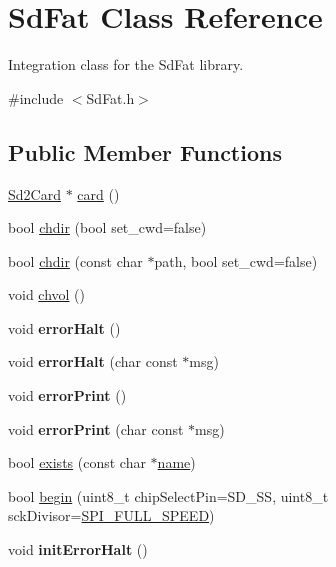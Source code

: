 \hypertarget{class_sd_fat}{}\section{Sd\+Fat Class Reference}
\label{class_sd_fat}


Integration class for the Sd\+Fat library.  




{\ttfamily \#include $<$Sd\+Fat.\+h$>$}

\subsection*{Public Member Functions}
\begin{DoxyCompactItemize}
\item 
\hyperlink{class_sd2_card}{Sd2\+Card} $\ast$ \hyperlink{class_sd_fat_a9a4deb665fb0140daf22c62de3ae497d}{card} ()
\item 
bool \hyperlink{class_sd_fat_aba234d73505354cbb105b4ad7d3524b0}{chdir} (bool set\+\_\+cwd=false)
\item 
bool \hyperlink{class_sd_fat_aa17f9efe90fb42543395c43804b120f0}{chdir} (const char $\ast$path, bool set\+\_\+cwd=false)
\item 
void \hyperlink{class_sd_fat_a1c61e5433f4734f9fb3e1426fd804494}{chvol} ()
\item 
void {\bfseries error\+Halt} ()\hypertarget{class_sd_fat_aaba28b5be802f623969022226e6dfd21}{}\label{class_sd_fat_aaba28b5be802f623969022226e6dfd21}

\item 
void {\bfseries error\+Halt} (char const $\ast$msg)\hypertarget{class_sd_fat_a8240ad752998c4788a9aa8fea4f6f075}{}\label{class_sd_fat_a8240ad752998c4788a9aa8fea4f6f075}

\item 
void {\bfseries error\+Print} ()\hypertarget{class_sd_fat_a1ff9f2027978d6ea5fcbd81d53378a7f}{}\label{class_sd_fat_a1ff9f2027978d6ea5fcbd81d53378a7f}

\item 
void {\bfseries error\+Print} (char const $\ast$msg)\hypertarget{class_sd_fat_a47256ec22b421d76bbf86901d47226fa}{}\label{class_sd_fat_a47256ec22b421d76bbf86901d47226fa}

\item 
bool \hyperlink{class_sd_fat_a15e97702e6a8654a86a745dc20c9ae8a}{exists} (const char $\ast$\hyperlink{_sd_fat_structs_8h_a30308c9b983377042fd2cc8900454fb1}{name})
\item 
bool \hyperlink{class_sd_fat_a94174f5a2ddb9b4672d3028849e22d1d}{begin} (uint8\+\_\+t chip\+Select\+Pin=S\+D\+\_\+\+SS, uint8\+\_\+t sck\+Divisor=\hyperlink{_sd2_card_8h_a6c091c07d1eb82a94b1c5738f720264b}{S\+P\+I\+\_\+\+F\+U\+L\+L\+\_\+\+S\+P\+E\+ED})
\item 
void {\bfseries init\+Error\+Halt} ()\hypertarget{class_sd_fat_a6294adccc03e23e35db6488bf9ace69f}{}\label{class_sd_fat_a6294adccc03e23e35db6488bf9ace69f}


\end{DoxyCompactItemize}
